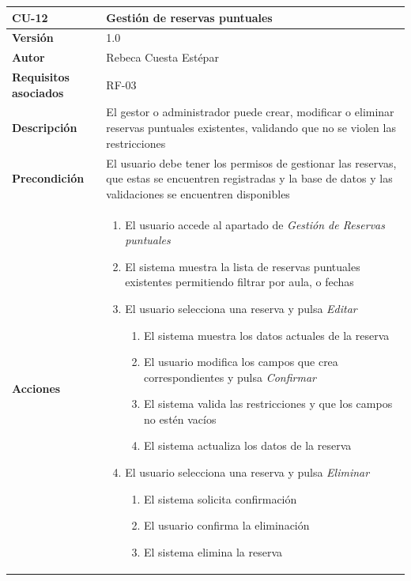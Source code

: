 \begin{table}[p]
	\centering
	\begin{tabularx}{\linewidth}{ p{} p{} }
		\toprule
		\textbf{CU-12}    & \textbf{Gestión de reservas puntuales}\\
		\toprule
		\textbf{Versión}              & 1.0    \\
		\textbf{Autor}                & Rebeca Cuesta Estépar \\
		\textbf{Requisitos asociados} & RF-03 \\
		\textbf{Descripción}          & El gestor o administrador puede crear, modificar o eliminar reservas puntuales existentes, validando que no se violen las restricciones \\
		\textbf{Precondición}         & El usuario debe tener los permisos de gestionar las reservas, que estas se encuentren registradas y la base de datos y las validaciones se encuentren disponibles \\
		\textbf{Acciones}             &
		\begin{enumerate}
			\def\labelenumi{\arabic{enumi}.}
			\tightlist
			\item El usuario accede al apartado de \emph{Gestión de Reservas puntuales}
			\item El sistema muestra la lista de reservas puntuales existentes permitiendo filtrar por aula, o fechas
			\item El usuario selecciona una reserva y pulsa \emph{Editar}
			\begin{enumerate}[label*=\arabic*., itemsep=0.5pt, topsep=0.5pt, leftmargin=1em]
				\tightlist
				\item El sistema muestra los datos actuales de la reserva
				\item El usuario modifica los campos que crea correspondientes y pulsa \emph{Confirmar}
				\item El sistema valida las restricciones y que los campos no estén vacíos
				\item El sistema actualiza los datos de la reserva
			\end{enumerate}
			\item El usuario selecciona una reserva y pulsa \emph{Eliminar}
			\begin{enumerate}[label*=\arabic*., itemsep=0.5pt, topsep=0.5pt, leftmargin=1em]
				\tightlist
				\item El sistema solicita confirmación
				\item El usuario confirma la eliminación
				\item El sistema elimina la reserva
			\end{enumerate}
			

\end{enumerate}
\end{tabularx}
\end{table}
